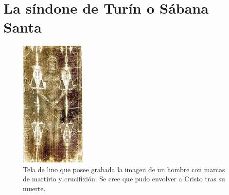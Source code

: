 \section{La síndone de Turín o Sábana Santa} \label{app:sindone}

\begin{figure}[H]
    \centering
    \includegraphics[width=0.29\textwidth]{sindone.jpg}
    \caption{Tela de lino que posee grabada la imagen de un hombre con marcas de martirio y crucifixión. Se cree que pudo envolver a Cristo tras su muerte.} %
\end{figure}

